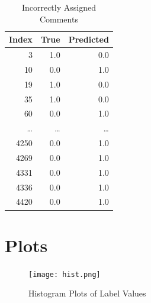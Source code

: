 \documentclass[11pt]{article}
\begin{document}
\begin{table}[htbp]
\centering
\begin{tabular}{rrr}
\textbf{Index} & \textbf{True} & \textbf{Predicted}\\
\hline
3 & 1.0 & 0.0\\
10 & 0.0 & 1.0\\
19 & 1.0 & 0.0\\
35 & 1.0 & 0.0\\
60 & 0.0 & 1.0\\
\ldots{} & \ldots{} & \ldots{}\\
4250 & 0.0 & 1.0\\
4269 & 0.0 & 1.0\\
4331 & 0.0 & 1.0\\
4336 & 0.0 & 1.0\\
4420 & 0.0 & 1.0\\
\end{tabular}
\caption{Incorrectly Assigned Comments}

\end{table}


\section{Plots}
\label{sec:org1ee0b7d}

\begin{figure}[H]
\centering
\texttt{[image: hist.png]}
\caption{Histogram Plots of Label Values}
\end{figure}
\end{document}
